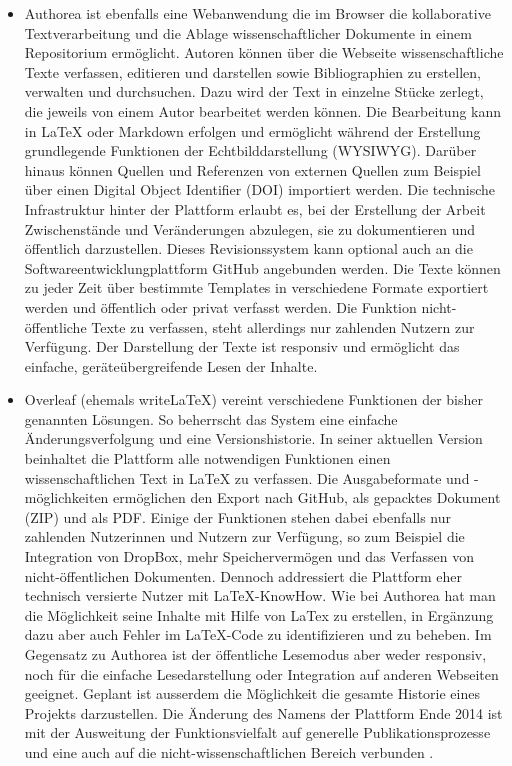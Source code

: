 \begin{itemize}
\item Authorea ist ebenfalls eine Webanwendung die im Browser die kollaborative Textverarbeitung  und die Ablage wissenschaftlicher Dokumente in einem Repositorium ermöglicht. Autoren können über die Webseite wissenschaftliche Texte verfassen, editieren und darstellen sowie Bibliographien zu erstellen, verwalten und durchsuchen. Dazu wird der Text in einzelne Stücke zerlegt, die jeweils von einem Autor bearbeitet werden können. Die Bearbeitung kann in LaTeX oder Markdown erfolgen und ermöglicht während der Erstellung grundlegende Funktionen der Echtbilddarstellung (WYSIWYG). Darüber hinaus können Quellen und Referenzen von externen Quellen zum Beispiel über einen Digital Object Identifier (DOI) importiert werden. Die technische Infrastruktur hinter der Plattform erlaubt es, bei der Erstellung der Arbeit Zwischenstände und Veränderungen abzulegen, sie zu dokumentieren und öffentlich darzustellen. Dieses Revisionssystem kann optional auch an die Softwareentwicklungplattform GitHub angebunden werden. Die Texte können zu jeder Zeit über bestimmte Templates in verschiedene Formate exportiert werden und öffentlich oder privat verfasst werden. Die Funktion nicht-öffentliche Texte zu verfassen, steht allerdings nur zahlenden Nutzern zur Verfügung. Der Darstellung der Texte ist responsiv und ermöglicht das einfache, geräteübergreifende Lesen der Inhalte.
\item Overleaf (ehemals writeLaTeX) vereint verschiedene Funktionen der bisher genannten Lösungen. So beherrscht das System eine einfache Änderungsverfolgung und eine Versionshistorie. In seiner aktuellen Version beinhaltet die Plattform alle notwendigen Funktionen einen wissenschaftlichen Text in LaTeX zu verfassen. Die Ausgabeformate und -möglichkeiten ermöglichen den Export nach GitHub, als gepacktes Dokument (ZIP) und als PDF. Einige der Funktionen stehen dabei ebenfalls nur zahlenden Nutzerinnen und Nutzern zur Verfügung, so zum Beispiel die Integration von DropBox, mehr Speichervermögen und das Verfassen von nicht-öffentlichen Dokumenten. Dennoch addressiert die Plattform eher technisch versierte Nutzer mit LaTeX-KnowHow. Wie bei Authorea hat man die Möglichkeit seine Inhalte mit Hilfe von LaTex zu erstellen, in Ergänzung dazu aber auch Fehler im LaTeX-Code zu identifizieren und zu beheben. Im Gegensatz zu Authorea ist der öffentliche Lesemodus aber weder responsiv, noch für die einfache Lesedarstellung oder Integration auf anderen Webseiten geeignet. Geplant ist ausserdem die Möglichkeit die gesamte Historie eines Projekts darzustellen. Die Änderung des Namens der Plattform Ende 2014 ist mit der Ausweitung der Funktionsvielfalt auf generelle Publikationsprozesse und eine auch auf die nicht-wissenschaftlichen Bereich verbunden \cite{overleaf_2014}.

\end{itemize}
